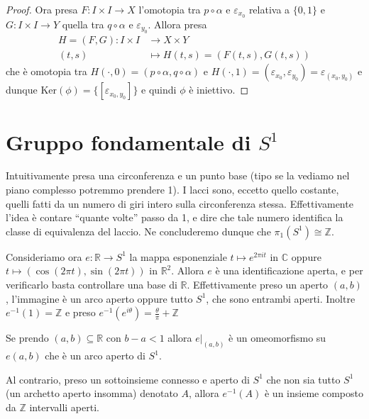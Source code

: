 \begin{proof}
    Ora presa \(F : I \times  I \to X\) l'omotopia tra \(p \circ \alpha\) e
    \(\varepsilon_{x_{0}} \) relativa a \(\{0, 1\} \) e \(G : I \times I \to Y\)
    quella tra \(q \circ \alpha\) e \(\varepsilon_{y_{0}} \). Allora presa
    \begin{align*}
        H = {(F, G)}: I \times I &\longrightarrow X \times Y \\
        {(t,s)} &\longmapsto H{(t,s)} = {(F{(t,s)}, G{(t, s)})}
    \end{align*}
    che è omotopia tra \(H{(\cdot , 0)} = {(p \circ \alpha, q \circ \alpha)}\) e
    \(H{(\cdot , 1)} = {(\varepsilon_{x_{0}} , \varepsilon_{y_{0}} )} =
    \varepsilon_{{(x_{0}, y_{0})}} \) 
e dunque \(\mathrm{Ker}{(\phi)} = \{[\varepsilon_{x_{0},y_{0}}] \}\) e quindi
\(\phi\) è iniettivo.
\end{proof}

\section{Gruppo fondamentale di \(S^{1}\)}

Intuitivamente presa una circonferenza e un punto base (tipo se la vediamo nel
piano complesso potremmo prendere 1). I lacci sono, eccetto quello costante,
quelli fatti da un numero di giri intero sulla circonferenza stessa.
Effettivamente l'idea è contare ``quante volte'' passo da 1, e dire che tale
numero identifica la classe di equivalenza del laccio. Ne concluderemo dunque
che \(\pi_{1}{(S^{1})} \cong \mathbb{Z}\).

Consideriamo ora \(e : \mathbb{R} \to S^{1}\) la mappa esponenziale \(t \mapsto
e^{2\pi i t}\) in \(\mathbb{C}\) oppure \(t \mapsto {(\cos{(2\pi t)}, \sin{(2
\pi t)})}\) in \(\mathbb{R}^2\). Allora \(e\) è una identificazione aperta, e
per verificarlo basta controllare una base di \(\mathbb{R}\). Effettivamente
preso un aperto \({(a,b)}\), l'immagine è un arco aperto oppure tutto \(S^{1}\),
che sono entrambi aperti. Inoltre \(e^{-1}{(1)} = \mathbb{Z}\) e preso
\(e^{-1}{(e^{i\theta})} = \frac{\theta}{\pi} + \mathbb{Z}\) 
\begin{remark}
    Se prendo \({(a,b)} \subseteq \mathbb{R} \) con \(b-a < 1\) allora
    \(e|_{{(a,b)}} \) è un omeomorfismo su \(e{(a,b)}\) che è un arco aperto di
    \(S^{1}\).
\end{remark}
\begin{remark}
    Al contrario, preso un sottoinsieme connesso e aperto di \(S^{1}\) che non
    sia tutto \(S^{1}\) (un archetto aperto insomma) denotato \(A\), allora
    \(e^{-1}{(A)}\) è un insieme composto da \(\mathbb{Z}\) intervalli aperti.

\end{remark}

